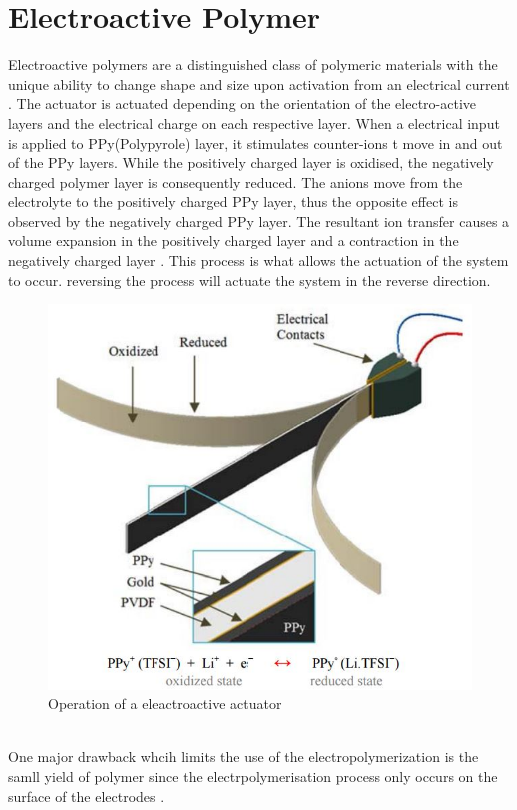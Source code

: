 \documentclass[11pt,twocolumn]{article}
\begin{document}
\section{Electroactive Polymer}
Electroactive polymers are a distinguished class of polymeric materials with the unique ability to change shape and size upon activation from an electrical current \cite{pillay2014review}. The actuator is actuated depending on the orientation of the electro-active layers and the electrical charge on each respective layer. When a electrical input is applied to PPy(Polypyrole) layer, it stimulates counter-ions t move in and out of the PPy layers. While the positively charged layer is oxidised, the negatively charged polymer layer is consequently reduced. The anions move from the electrolyte to the positively charged PPy layer, thus the opposite effect is observed by the negatively charged PPy layer. The resultant ion transfer causes a volume expansion in the positively charged layer and a contraction in the negatively charged layer \cite{mutlu2013electroactive}. This process is what allows the actuation of the system to occur. reversing the process will actuate the system in the reverse direction.
\\
\newline

\begin{figure}[h]
\centering
\includegraphics[scale=0.6]{electroactive}
\caption{Operation of a eleactroactive actuator}
\label{fig:electro1}
\end{figure}
\\
One major drawback whcih limits the use of the electropolymerization is the samll yield of polymer since the electrpolymerisation process only occurs on the surface of the electrodes \cite{pillay2014review}.
\end{document}
